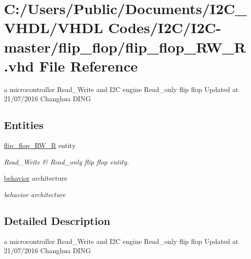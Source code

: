 \hypertarget{flip__flop___r_w___r_8vhd}{}\section{C\+:/\+Users/\+Public/\+Documents/\+I2\+C\+\_\+\+V\+H\+D\+L/\+V\+H\+DL Codes/\+I2\+C/\+I2\+C-\/master/flip\+\_\+flop/flip\+\_\+flop\+\_\+\+R\+W\+\_\+R.vhd File Reference}
\label{flip__flop___r_w___r_8vhd}


a microcontroller Read\+\_\+\+Write and I2C engine Read\+\_\+only flip flop Updated at 21/07/2016 Changhua D\+I\+NG  


\subsection*{Entities}
\begin{DoxyCompactItemize}
\item 
\hyperlink{classflip__flop___r_w___r}{flip\+\_\+flop\+\_\+\+R\+W\+\_\+R} entity
\begin{DoxyCompactList}\small\item\em Read\+\_\+\+Write \& Read\+\_\+only flip flop entity. \end{DoxyCompactList}\item 
\hyperlink{classflip__flop___r_w___r_1_1behavior}{behavior} architecture
\begin{DoxyCompactList}\small\item\em behavior architecture \end{DoxyCompactList}\end{DoxyCompactItemize}


\subsection{Detailed Description}
a microcontroller Read\+\_\+\+Write and I2C engine Read\+\_\+only flip flop Updated at 21/07/2016 Changhua D\+I\+NG 

